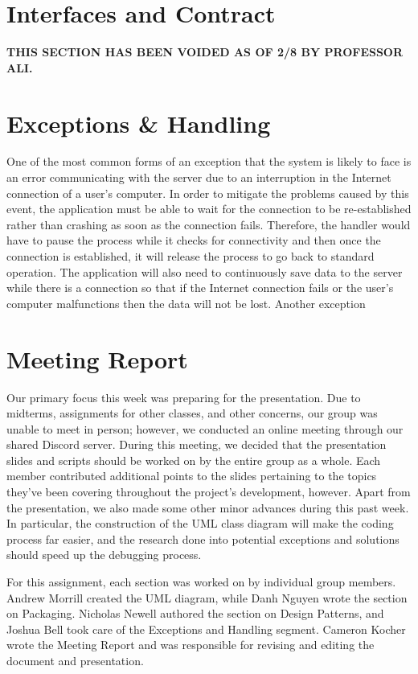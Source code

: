 \documentclass[12pt]{article}
\begin{document}
\section{Interfaces and Contract}
\textbf{THIS SECTION HAS BEEN VOIDED AS OF 2/8 BY PROFESSOR ALI.}
\section{Exceptions \& Handling} 
   One of the most common forms of an exception that the system is likely to face is an error communicating with the server due to an interruption in the Internet connection of a user's computer. In order to mitigate the problems caused by this event, the application must be able to wait for the connection to be re-established rather than crashing as soon as the connection fails. Therefore, the handler would have to pause the process while it checks for connectivity and then once the connection is established, it will release the process to go back to standard operation. The application will also need to continuously save data to the server while there is a connection so that if the Internet connection fails or the user's computer malfunctions then the data will not be lost.
   Another exception 
\section{Meeting Report}
\begin{flushleft}
Our primary focus this week was preparing for the presentation. Due to midterms, assignments for other classes, and other concerns, our group was unable to meet in person; however, we conducted an online meeting through our shared Discord server. During this meeting, we decided that the presentation slides and scripts should be worked on by the entire group as a whole. Each member contributed additional points to the slides pertaining to the topics they've been covering throughout the project's development, however. Apart from the presentation, we also made some other minor advances during this past week. In particular, the construction of the UML class diagram will make the coding process far easier, and the research done into potential exceptions and solutions should speed up the debugging process.
\end{flushleft}
\begin{flushleft}
For this assignment, each section was worked on by individual group members. Andrew Morrill created the UML diagram, while Danh Nguyen wrote the section on Packaging. Nicholas Newell authored the section on Design Patterns, and Joshua Bell took care of the Exceptions and Handling segment. Cameron Kocher wrote the Meeting Report and was responsible for revising and editing the document and presentation.
\end{flushleft}
\end{document}
